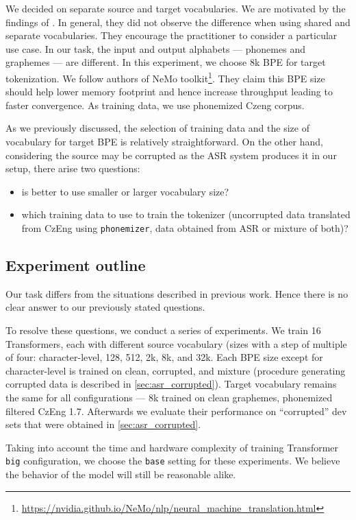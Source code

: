 We decided on separate source and target vocabularies. We are motivated by the findings of . In general, they did not observe the difference when using shared and separate vocabularies. They encourage the practitioner to consider a particular use case. In our task, the input and output alphabets --- phonemes and graphemes --- are different. In this experiment, we choose 8k BPE for target tokenization. We follow authors of NeMo toolkit\footnote{\url{https://nvidia.github.io/NeMo/nlp/neural_machine_translation.html}}. They claim this BPE size should help lower memory footprint and hence increase throughput leading to faster convergence. As training data, we use phonemized Czeng corpus. 

As we previously discussed, the selection of training data and the size of vocabulary for target BPE is relatively straightforward. On the other hand, considering the source may be corrupted as the ASR system produces it in our setup, there arise two questions: 

\begin{itemize}
	\item is better to use smaller or larger vocabulary size?
	\item which training data to use to train the tokenizer (uncorrupted data translated from CzEng using \texttt{phonemizer}, data obtained from ASR or mixture of both)?
\end{itemize}



\subsection{Experiment outline}
Our task differs from the situations described in previous work. Hence there is no clear answer to our previously stated questions.

To resolve these questions, we conduct a series of experiments. We train 16 Transformers, each with different source vocabulary (sizes with a step of multiple of four: character-level, 128, 512, 2k, 8k, and 32k. Each BPE size except for character-level is trained on clean, corrupted, and mixture (procedure generating corrupted data is described in \cref{sec:asr_corrupted}). Target vocabulary remains the same for all configurations --- 8k trained on clean graphemes, phonemized filtered CzEng 1.7. Afterwards we evaluate their performance on ``corrupted'' dev sets that were obtained in \cref{sec:asr_corrupted}.

Taking into account the time and hardware complexity of training Transformer \texttt{big} configuration, we choose the \texttt{base} setting for these experiments. We believe the behavior of the model will still be reasonable alike.

